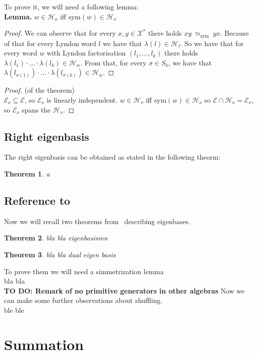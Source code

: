 \documentclass[a4paper, 12pt]{report}
\newtheorem{theorem}{Theorem}
\newcommand{\todo}[1]{\hfill \break \textbf{\Huge TO DO: #1 \hfill \break}\normalsize}
\newcommand{\SimeqSym}{{\simeq_\mathrm{sym}}}
\begin{document}
To prove it, we will need a following lemma: \\
\noindent \textbf{Lemma.} $w \in \mathcal{H}_\nu$ iff $\mathrm{sym}(w) \in \mathcal{H}_\nu$
\begin{proof}
We can observe that for every $x, y \in \mathcal{X}^*$ there holds $xy\ \SimeqSym\ yx$. Because of that
for every Lyndon word $l$ we have that $\lambda(l) \in \mathcal{H}_l$. So we have that for every word $w$
with Lyndon factorisation $(l_1,\dots, l_k)$ there holds
$\lambda(l_1)\cdot\ldots\cdot\lambda(l_k) \in \mathcal{H}_w$. From that, for every
$\sigma \in S_k$, we have that $\lambda(l_{\sigma(1)})\cdot\ldots\cdot\lambda(l_{\sigma(k)}) \in
\mathcal{H}_w$.

\end{proof}
\begin{proof}(of the theorem) \\
$\mathcal{E}_\nu \subseteq\mathcal{E}$,
so $\mathcal{E}_\nu$ is linearly independent. $w \in \mathcal{H}_\nu$ iff
$\mathrm{sym}(w) \in \mathcal{H}_\nu$ so $\mathcal{E} \cap \mathcal{H}_\nu = \mathcal{E}_\nu$, so
$\mathcal{E}_\nu$ spans the $\mathcal{H}_\nu$.
\end{proof}
\section{Right eigenbasis}
The right eigenbasis can be obtained as stated in the following theorm:
\begin{theorem}
    a
\end{theorem}
\section{Reference to~\cite{Diaconis2014}}
Now we will recall two theorems from~\cite{Diaconis2014} describing eigenbases.
\begin{theorem}
bla bla eigenbasismn
\end{theorem}
\begin{theorem}
bla bla dual eigen basis
\end{theorem}
To prove them we will need a simmetrization lemma \\
bla bla\\[8pt]
\todo{Remark of no primitive generators in other algebras}
Now we can make some further observations about shuffling.\\
ble ble\\

\chapter{Summation}


{}

\end{document}
